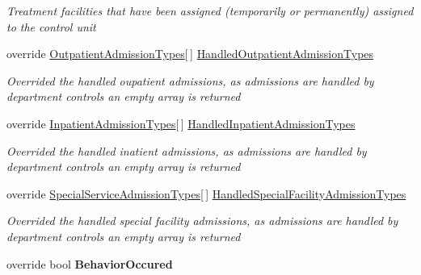\begin{DoxyCompactItemize}
\begin{DoxyCompactList}\small\item\em Treatment facilities that have been assigned (temporarily or permanently) assigned to the control unit \end{DoxyCompactList}\item 
override \hyperlink{class_general_health_care_elements_1_1_treatment_admission_types_1_1_outpatient_admission_types}{Outpatient\+Admission\+Types}\mbox{[}$\,$\mbox{]} \hyperlink{class_general_health_care_elements_1_1_control_units_1_1_control_unit_organizational_unit_a71c87e0c6c3bc2cd8c541a148873e080}{Handled\+Outpatient\+Admission\+Types}
\begin{DoxyCompactList}\small\item\em Overrided the handled oupatient admissions, as admissions are handled by department controls an empty array is returned \end{DoxyCompactList}\item 
override \hyperlink{class_general_health_care_elements_1_1_treatment_admission_types_1_1_inpatient_admission_types}{Inpatient\+Admission\+Types}\mbox{[}$\,$\mbox{]} \hyperlink{class_general_health_care_elements_1_1_control_units_1_1_control_unit_organizational_unit_ab60c7e9972cb08682a2aa3c2498f8225}{Handled\+Inpatient\+Admission\+Types}
\begin{DoxyCompactList}\small\item\em Overrided the handled inatient admissions, as admissions are handled by department controls an empty array is returned \end{DoxyCompactList}\item 
override \hyperlink{class_general_health_care_elements_1_1_treatment_admission_types_1_1_special_service_admission_types}{Special\+Service\+Admission\+Types}\mbox{[}$\,$\mbox{]} \hyperlink{class_general_health_care_elements_1_1_control_units_1_1_control_unit_organizational_unit_a68a3bc497c0870fcc76866e1e762d513}{Handled\+Special\+Facility\+Admission\+Types}
\begin{DoxyCompactList}\small\item\em Overrided the handled special facility admissions, as admissions are handled by department controls an empty array is returned \end{DoxyCompactList}\item 
override bool {\bfseries Behavior\+Occured}\hypertarget{class_general_health_care_elements_1_1_control_units_1_1_control_unit_organizational_unit_afe42d5d810ca5e8983fa190f49264951}{}\label{class_general_health_care_elements_1_1_control_units_1_1_control_unit_organizational_unit_afe42d5d810ca5e8983fa190f49264951}

\end{DoxyCompactItemize}
